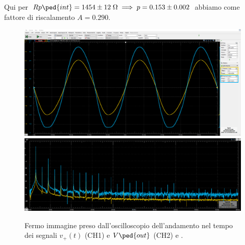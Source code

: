 \documentclass[10pt, a4paper, italian]{article}
\begin{document}
Qui per $Rp\ped{int} = 1454 \pm 12 \; \si{\ohm} \implies p = 0.153 \pm 0.002$ 
abbiamo come fattore di riscalamento $A = 0.290$. 
\begin{figure}[htbp]
	\centering
	\includegraphics[scale=0.335]{Rpint1.2V}	
	\includegraphics[scale=0.37]{Rpint1.2Vfft}
	\caption{Fermo immagine preso dall'oscilloscopio dell'andamento nel tempo dei
	segnali $v_+ (t)$ (CH1) e $V\ped{out}$ (CH2) e . \label{fig: Rpint}}
\end{figure}
\end{document}
